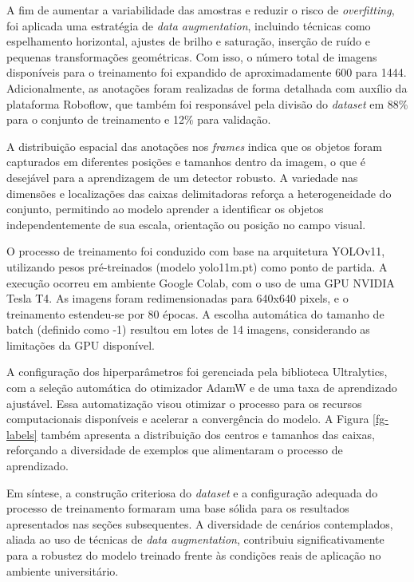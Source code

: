 A fim de aumentar a variabilidade das amostras e reduzir o risco de \textit{overfitting}, foi aplicada uma estratégia de \textit{data augmentation}, incluindo técnicas como espelhamento horizontal, ajustes de brilho e saturação, inserção de ruído e pequenas transformações geométricas. Com isso, o número total de imagens disponíveis para o treinamento foi expandido de aproximadamente 600 para 1444. Adicionalmente, as anotações foram realizadas de forma detalhada com auxílio da plataforma Roboflow, que também foi responsável pela divisão do \textit{dataset} em 88\% para o conjunto de treinamento e 12\% para validação.

A distribuição espacial das anotações nos \textit{frames} indica que os objetos foram capturados em diferentes posições e tamanhos dentro da imagem, o que é desejável para a aprendizagem de um detector robusto. A variedade nas dimensões e localizações das caixas delimitadoras reforça a heterogeneidade do conjunto, permitindo ao modelo aprender a identificar os objetos independentemente de sua escala, orientação ou posição no campo visual.

O processo de treinamento foi conduzido com base na arquitetura YOLOv11, utilizando pesos pré-treinados (modelo yolo11m.pt) como ponto de partida. A execução ocorreu em ambiente Google Colab, com o uso de uma GPU NVIDIA Tesla T4. As imagens foram redimensionadas para 640x640 pixels, e o treinamento estendeu-se por 80 épocas. A escolha automática do tamanho de batch (definido como -1) resultou em lotes de 14 imagens, considerando as limitações da GPU disponível.

A configuração dos hiperparâmetros foi gerenciada pela biblioteca Ultralytics, com a seleção automática do otimizador AdamW e de uma taxa de aprendizado ajustável. Essa automatização visou otimizar o processo para os recursos computacionais disponíveis e acelerar a convergência do modelo. A Figura \ref{fg-labels} também apresenta a distribuição dos centros e tamanhos das caixas, reforçando a diversidade de exemplos que alimentaram o processo de aprendizado.

Em síntese, a construção criteriosa do \textit{dataset} e a configuração adequada do processo de treinamento formaram uma base sólida para os resultados apresentados nas seções subsequentes. A diversidade de cenários contemplados, aliada ao uso de técnicas de \textit{data augmentation}, contribuiu significativamente para a robustez do modelo treinado frente às condições reais de aplicação no ambiente universitário.


